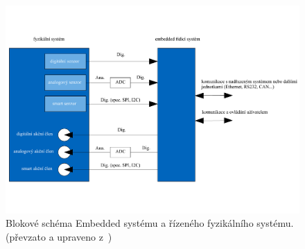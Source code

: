 \documentclass[a4paper, twoside, 11pt]{article}
\newcommand{\fbar}{\FloatBarrier}
\begin{document}
	\begin{figure}[htbp!]
		\centering
			\includegraphics[width=1\textwidth]{src/pdf/embedded-system-scheme.pdf} 
			\caption{Blokové schéma Embedded systému a řízeného fyzikálního systému. (převzato a upraveno z~\cite{juan-fpgas})}
			\label{fig:embedded-system-scheme}
	\end{figure}

		\fbar
\end{document}
